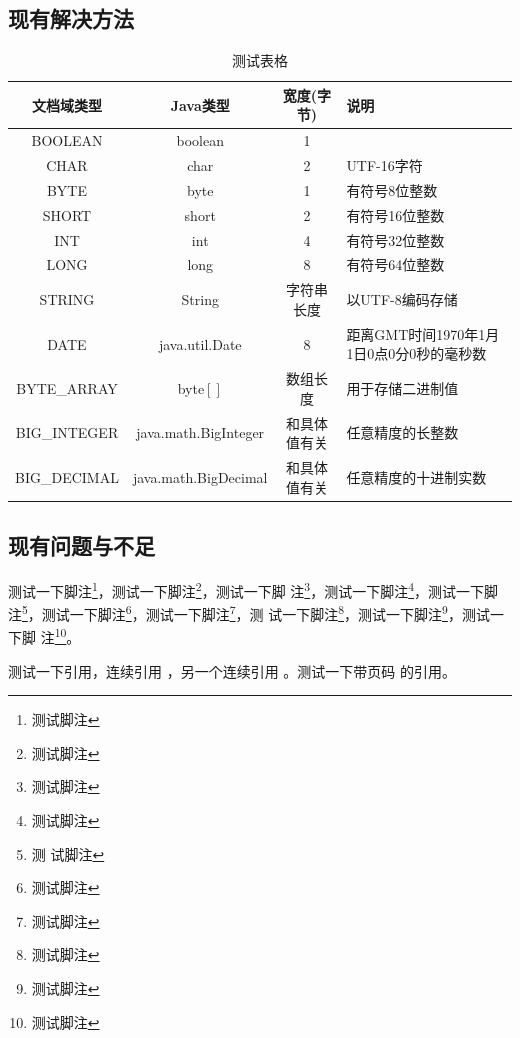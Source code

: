 \subsection{现有解决方法}
\Blindtext
\begin{table}
  \centering
  \begin{tabular}{cccp{38mm}}
    \toprule
    \textbf{文档域类型} & \textbf{Java类型} & \textbf{宽度(字节)} & \textbf{说明} \\
    \midrule
    BOOLEAN  & boolean &  1  & \\
    CHAR     & char    &  2  & UTF-16字符 \\
    BYTE     & byte    &  1  & 有符号8位整数 \\
    SHORT    & short   &  2  & 有符号16位整数 \\
    INT      & int     &  4  & 有符号32位整数 \\
    LONG     & long    &  8  & 有符号64位整数 \\
    STRING   & String  &  字符串长度  & 以UTF-8编码存储 \\
    DATE     & java.util.Date & 8 & 距离GMT时间1970年1月1日0点0分0秒的毫秒数 \\
    BYTE\_ARRAY & byte$[]$ & 数组长度 & 用于存储二进制值 \\
    BIG\_INTEGER & java.math.BigInteger & 和具体值有关 & 任意精度的长整数 \\
    BIG\_DECIMAL & java.math.BigDecimal & 和具体值有关 & 任意精度的十进制实数 \\
    \bottomrule
  \end{tabular}
  \caption{测试表格}\label{table:test1}
\end{table}
\Blindtext
\subsection{现有问题与不足}

测试一下脚注\footnote{测试脚注}，测试一下脚注\footnote{测试脚注}，测试一下脚
注\footnote{测试脚注}，测试一下脚注\footnote{测试脚注}，测试一下脚注\footnote{测
  试脚注}，测试一下脚注\footnote{测试脚注}，测试一下脚注\footnote{测试脚注}，测
试一下脚注\footnote{测试脚注}，测试一下脚注\footnote{测试脚注}，测试一下脚
注\footnote{测试脚注}。

测试一下引用\cite{newman2006structure}，连续引用
\cite{newman2001random,aiello2000random,bollobas2001random}，另一个连续引用
\cite{newman2001random,bollobas2001random,barabasi1999emergence}。测试一下带页码
的引用\cite[124--128]{erdHos1961strength}。

